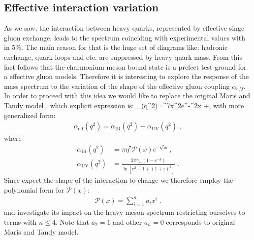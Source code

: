 \subsection*{Effective interaction variation}\label{int1}
As we saw, the interaction between heavy quarks, represented by effective singe gluon exchange, leads to 
the spectrum coinciding with experimental values with in 5\%. The main reason for that is the huge set of diagrams like: hadronic exchange, quark loops and etc. are suppressed by heavy quark mass. From this fact follows that the charmonium meson bound state is a prefect test-ground for a effective gluon models. Therefore it is interesting to explore the response of the mass spectrum to the variation of the shape of the effective gluon coupling $\alpha_{eff}$. In order to proceed with this idea we would like to replace the original Maris and Tandy model \cite{Maris:1999nt}, which explicit expression is:
\beqa
\label{spec:MT_model}
\alpha_{}(q^2)=\pi\eta^7x^2e^{-\eta^2x}
+\;,
\eeqa
with more generalized form:
\begin{align}\label{spec:generalmaristandy}
%
  \alpha_{\mathrm{eff}}(q^2)=\alpha_{\mathrm{IR}}(q^2)+\alpha_{\mathrm{UV}}(q^2)\;,
%
\end{align}
%
where
%
\begin{align}\label{spec:generalmaristandy2}
%
  \alpha_{\mathrm{IR}}(q^2) &= \pi\eta^7\mathcal{P}(x)e^{-\eta^2x}\;,\\
  \alpha_{\mathrm{UV}}(q^2) &= \frac{2\pi\gamma_m\left(1-e^{-y}\right)}{\ln\left[e^2-1+(1+z)^2\right]}\;.
%
\end{align}
Since expect the shape of the interaction to change we therefore employ the polynomial form for $\mathcal{P}(x)$:
\begin{align}\label{spec:polinomMT}
%
  \mathcal{P}(x) = \sum_{i=1}^n a_i x^{i}\;.
%
\end{align}
%
and investigate its impact on the heavy meson spectrum restricting ourselves 
to terms with $n \le 4$. Note that $a_2=1$ and other $a_n=0$ corresponds to original Maris and Tandy model. 
